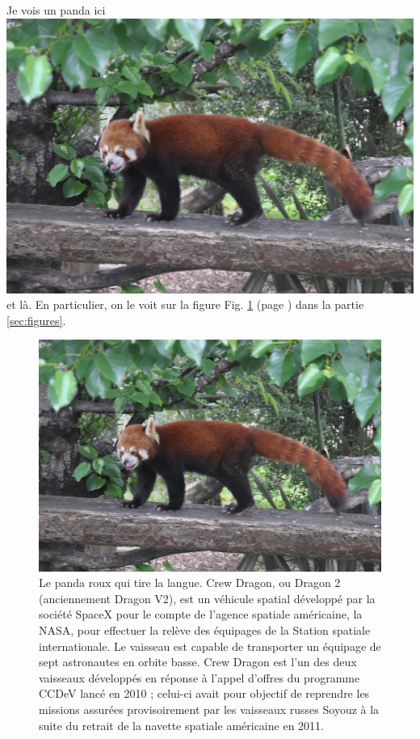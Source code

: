\documentclass[a4paper, twoside]{article}
\begin{document}
Je vois un panda ici \includegraphics[scale=.01]{figures/panda.JPG} et là. En particulier, on le voit sur la figure Fig. \ref{fig:panda_roux} (page \pageref{fig:panda_roux}) dans la partie \ref{sec:figures}.


\begin{figure}[h]
\begin{center}
\includegraphics[width = .9 \textwidth]{figures/panda.JPG}
\end{center}
\caption{Le panda roux qui tire la langue. Crew Dragon, ou Dragon 2 (anciennement Dragon V2), est un véhicule spatial développé par la société SpaceX pour le compte de l'agence spatiale américaine, la NASA, pour effectuer la relève des équipages de la Station spatiale internationale. Le vaisseau est capable de transporter un équipage de sept astronautes en orbite basse. Crew Dragon est l'un des deux vaisseaux développés en réponse à l'appel d'offres du programme CCDeV lancé en 2010 ; celui-ci avait pour objectif de reprendre les missions assurées provisoirement par les vaisseaux russes Soyouz à la suite du retrait de la navette spatiale américaine en 2011. }
\label{fig:panda_roux}
\end{figure}
\end{document}
